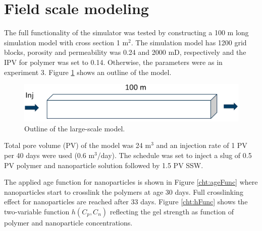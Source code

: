\section{Field scale modeling}
The full functionality of the simulator was tested by constructing a 100 m long simulation model with cross section 1 m$^2$. The simulation model has 1200 grid blocks, porosity and permeability was 0.24 and 2000 mD, respectively and the  IPV for polymer was set to 0.14. Otherwise, the parameters were as in experiment 3. Figure \ref{fig:largeScaleModel} shows an outline of the model.
\begin{figure}[h]
    \centering
    \includegraphics[width=\textwidth]{img/fig/largeScaleModel.png}
    \caption{Outline of the large-scale model. }
    \label{fig:largeScaleModel}
\end{figure}

Total pore volume (PV) of the model was 24 m$^3$ and an injection rate of 1 PV per 40 days were used (0.6 m$^3$/day). The schedule was set to inject a slug of 0.5 PV polymer and nanoparticle solution followed by 1.5 PV SSW. 

The applied age function for nanoparticles is shown in Figure \ref{cht:ageFunc} where nanoparticles start to crosslink the polymers at age 30 days. Full crosslinking effect for nanoparticles are reached after 33 days. Figure \ref{cht:hFunc} shows the two-variable function $h(C_p,C_n)$  reflecting the gel strength as function of polymer and nanoparticle concentrations.      

